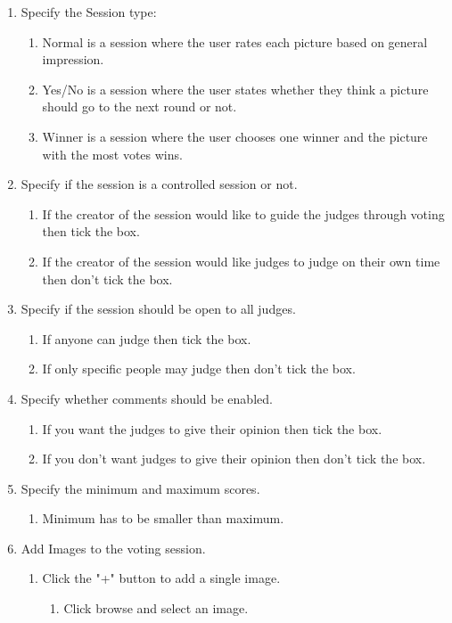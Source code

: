 \documentclass[10pt,a4paper]{article}
\begin{document}
\begin{enumerate}
\item Specify the Session type:
\begin{enumerate}
\item Normal is a session where the user rates each picture based on general impression.
\item Yes/No is a session where the user states whether they think a picture should go to the next round or not.
\item Winner is a session where the user chooses one winner and the picture with the most votes wins.
\end{enumerate}
\item Specify if the session is a controlled session or not.
\begin{enumerate}
\item If the creator of the session would like to guide the judges through voting then tick the box.
\item If the creator of the session would like judges to judge on their own time then don't tick the box.
\end{enumerate}
\item Specify if the session should be open to all judges.
\begin{enumerate}
\item If anyone can judge then tick the box.
\item If only specific people may judge then don't tick the box.
\end{enumerate}
\item Specify whether comments should be enabled.
\begin{enumerate}
\item If you want the judges to give their opinion then tick the box.
\item If you don't want judges to give their opinion then don't tick the box.
\end{enumerate}
\item Specify the minimum and maximum scores.
\begin{enumerate}
\item Minimum has to be smaller than maximum.
\end{enumerate}
\item Add Images to the voting session.
\begin{enumerate}
\item Click the "+" button to add a single image.
\begin{enumerate}
\item Click browse and select an image.

\end{enumerate}
\end{enumerate}
\end{enumerate}
\end{document}
